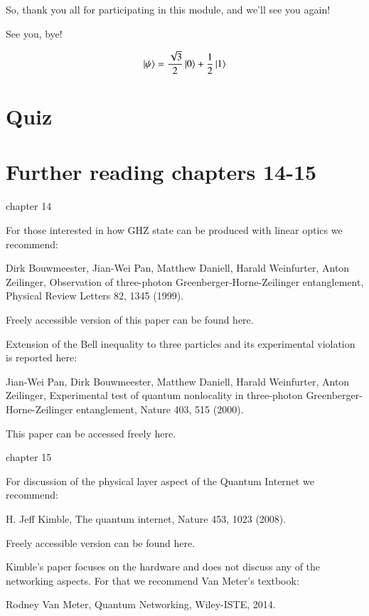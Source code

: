 So, thank you all for participating in this module, and we'll see you again!

See you, bye!




\newpage
\begin{exercises}
\begin{equation*}
\left| \psi \right\rangle = \frac{\sqrt{3}}{2}\left| 0 \right\rangle + \frac{1}{2}\left| 1 \right\rangle
\end{equation*}


\end{exercises}


\newpage
\section*{Quiz}


\section*{Further reading chapters 14-15}

chapter 14

For those interested in how GHZ state can be produced with linear optics we recommend:

Dirk Bouwmeester, Jian-Wei Pan, Matthew Daniell, Harald Weinfurter, Anton Zeilinger, Observation of three-photon Greenberger-Horne-Zeilinger entanglement, Physical Review Letters 82, 1345 (1999).

Freely accessible version of this paper can be found here.

Extension of the Bell inequality to three particles and its experimental violation is reported here:

Jian-Wei Pan, Dirk Bouwmeester, Matthew Daniell, Harald Weinfurter, Anton Zeilinger, Experimental test of quantum nonlocality in three-photon Greenberger-Horne-Zeilinger entanglement, Nature 403, 515 (2000).

This paper can be accessed freely here.

chapter 15

For discussion of the physical layer aspect of the Quantum Internet we recommend:

H. Jeff Kimble, The quantum internet, Nature 453, 1023 (2008).

Freely accessible version can be found here.

Kimble’s paper focuses on the hardware and does not discuss any of the networking aspects. For that we recommend Van Meter’s textbook:

Rodney Van Meter, Quantum Networking, Wiley-ISTE, 2014.
